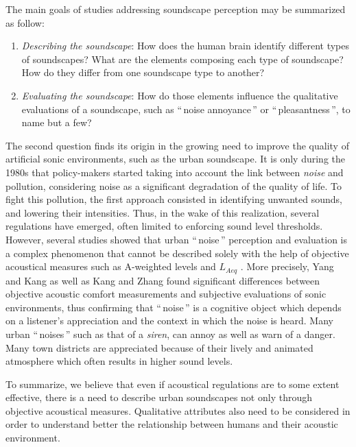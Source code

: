 \documentclass[12pt, titlepage, reqno]{article} %
\begin{document}
The main goals of studies addressing soundscape perception may be summarized as follow:

\begin{enumerate}
\item \textit{Describing the soundscape}: How does the human brain identify different types of soundscapes? What are the elements composing each type of soundscape? How do they differ from one soundscape type to another? 
\item \textit{Evaluating the soundscape}: How do those elements influence the qualitative evaluations of a soundscape, such as ``\,noise annoyance\,'' or ``\,pleasantness\,'', to name but a few?
\end{enumerate}

The second question finds its origin in the growing need to improve the quality of artificial sonic environments, such as the urban soundscape. It is only during the 1980s that policy-makers started taking into account the link between \textit{noise} and pollution, considering noise as a significant degradation of the quality of life. To fight this pollution, the first approach consisted in identifying unwanted sounds, and lowering their intensities. Thus, in the wake of this realization, several regulations have emerged, often limited to enforcing sound level thresholds. However, several studies showed that urban ``\,noise\,'' perception and evaluation is a complex phenomenon that cannot be described solely with the help of objective acoustical measures such as A-weighted levels and $L_{Aeq}$ \cite{schulte-fortkamp_soundscape_2006, schulte2013soundscape,dubois2006cognitive,dubois2000categories,raimbault_urban_2005,guastavino_etude_2003}. More precisely, Yang and Kang \cite{Yang2005211} as well as Kang and Zhang \cite{kang_semantic_2010} found significant differences between objective acoustic comfort measurements and subjective evaluations of sonic environments, thus confirming that ``\,noise\,''  is a cognitive object which depends on a listener's appreciation and the context in which the noise is heard. Many urban ``\,noises\,'' such as that of a \textit{siren}, can annoy as well as warn of a danger. Many town districts are appreciated because of their lively and animated atmosphere which often results in higher sound levels. 



To summarize, we believe that even if acoustical regulations  are to some extent effective, there is a need to describe urban soundscapes not only through objective acoustical measures. Qualitative attributes also need to be considered \cite{torija2013application, cain_development_2013} in order to understand better the relationship between humans and their acoustic environment\cite{schafer1977tuning}. 
\end{document}
